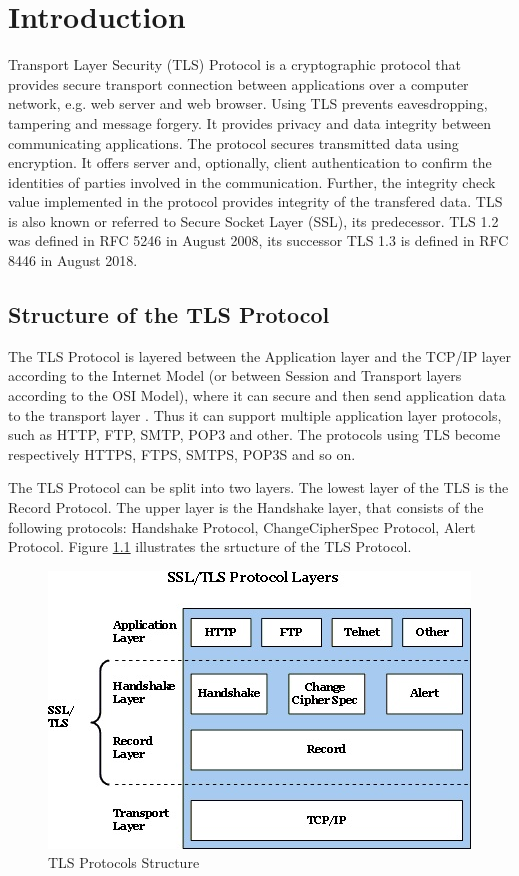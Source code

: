 \chapter{Introduction}
\label{chap:introduction}

Transport Layer Security (TLS) Protocol is a cryptographic protocol that provides secure transport connection between applications over a computer network, e.g. web server and web browser. 
 Using TLS prevents eavesdropping, tampering and message forgery. It provides privacy and data integrity between communicating applications. The protocol secures transmitted data using encryption. It offers server and, optionally, client authentication to confirm the identities of parties involved in the communication. Further, the integrity check value implemented in the protocol provides integrity of the transfered data. TLS is also known or referred to Secure Socket Layer (SSL), its predecessor. TLS 1.2 was defined in RFC 5246 in August 2008, its successor TLS 1.3 is defined in RFC 8446 in August 2018.
 \cite{RFC5246}

\section{Structure of the TLS Protocol}
\label{sec:stucture}

The TLS Protocol is layered between the Application layer and the TCP/IP layer according to the Internet Model (or between Session and Transport layers according to the OSI Model), where it can secure and then send application data to the transport layer \cite{ms:overview}. Thus it can support multiple application layer protocols, such as HTTP, FTP, SMTP, POP3 and other. The protocols using TLS become respectively HTTPS, FTPS, SMTPS, POP3S and so on.

The TLS Protocol can be split into two layers. The lowest layer of the TLS is the Record Protocol. The upper layer is the Handshake layer, that consists of the following protocols: Handshake Protocol, ChangeCipherSpec Protocol, Alert Protocol. Figure \ref{fig:tls_structure} illustrates the srtucture of the TLS Protocol. 


\begin{figure}[H]
	\centering
		\includegraphics[scale=1]{images/tls_structure.jpg}
	\caption{TLS Protocols Structure \cite{ms:overview}}
	\label{fig:tls_structure}
\end{figure}


